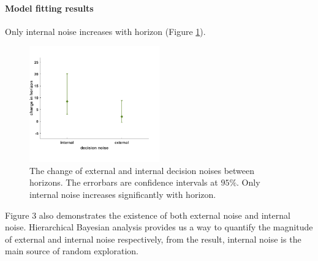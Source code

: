 \documentclass[12pt]{article}
\begin{document}
	\paragraph{Model fitting results} 
	
	Only internal noise increases  with horizon (Figure \ref{fig:modelbased}). 
	
	\begin{figure}[H]
		\begin{center}
			\includegraphics[width=0.5\textwidth]{figures/bayes.png}
			\caption{The change of external and internal decision noises between horizons. The errorbars are confidence intervals at $95\%$. Only internal noise increases significantly with horizon.}
			\label{fig:modelbased}
		\end{center}
	\end{figure}
	
	
	Figure 3 also demonstrates the existence of both external noise and internal noise. Hierarchical Bayesian analysis provides us a way to quantify the magnitude of external and internal noise respectively, from the result, internal noise is the main source of random exploration.
	
\end{document}
